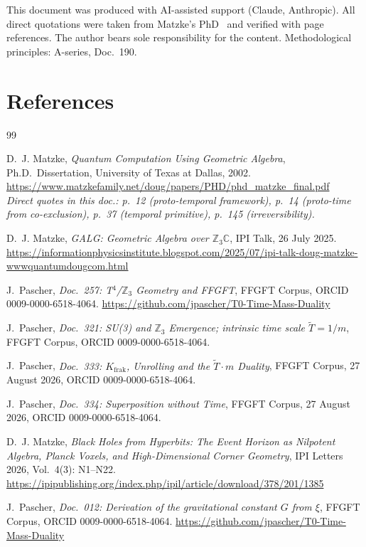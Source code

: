 \noindent
This document was produced with AI-assisted support (Claude, Anthropic).
All direct quotations were taken from Matzke's PhD~\cite{Matzke2002}
and verified with page references.
The author bears sole responsibility for the content.
Methodological principles: A-series, Doc.~190.

\section*{References}

\begin{thebibliography}{99}

D.~J. Matzke,
\textit{Quantum Computation Using Geometric Algebra},
Ph.D.\ Dissertation, University of Texas at Dallas, 2002.
\url{https://www.matzkefamily.net/doug/papers/PHD/phd_matzke_final.pdf}\\
\textit{Direct quotes in this doc.: p.~12 (proto-temporal framework),
p.~14 (proto-time from co-exclusion), p.~37 (temporal primitive),
p.~145 (irreversibility).}

D.~J. Matzke,
\textit{GALG: Geometric Algebra over $\mathbb{Z}_3\mathbb{C}$},
IPI Talk, 26 July 2025.
\url{https://informationphysicsinstitute.blogspot.com/2025/07/ipi-talk-doug-matzke-wwwquantumdougcom.html}

J.~Pascher,
\textit{Doc.~257: T$^4$/$\mathbb{Z}_3$ Geometry and FFGFT},
FFGFT Corpus, ORCID 0009-0000-6518-4064.
\url{https://github.com/jpascher/T0-Time-Mass-Duality}

J.~Pascher,
\textit{Doc.~321: SU(3) and $\mathbb{Z}_3$ Emergence;
intrinsic time scale $\tilde{T}=1/m$},
FFGFT Corpus, ORCID 0009-0000-6518-4064.

J.~Pascher,
\textit{Doc.~333: $K_\text{frak}$, Unrolling and the
$\tilde{T}\cdot m$ Duality},
FFGFT Corpus, 27 August 2026, ORCID 0009-0000-6518-4064.

J.~Pascher,
\textit{Doc.~334: Superposition without Time},
FFGFT Corpus, 27 August 2026, ORCID 0009-0000-6518-4064.


D.~J. Matzke,
\textit{Black Holes from Hyperbits: The Event Horizon as Nilpotent Algebra,
Planck Voxels, and High-Dimensional Corner Geometry},
IPI Letters 2026, Vol.~4(3): N1--N22.
\url{https://ipipublishing.org/index.php/ipil/article/download/378/201/1385}

J.~Pascher,
\textit{Doc.~012: Derivation of the gravitational constant $G$ from $\xi$},
FFGFT Corpus, ORCID 0009-0000-6518-4064.
\url{https://github.com/jpascher/T0-Time-Mass-Duality}

\end{thebibliography}
